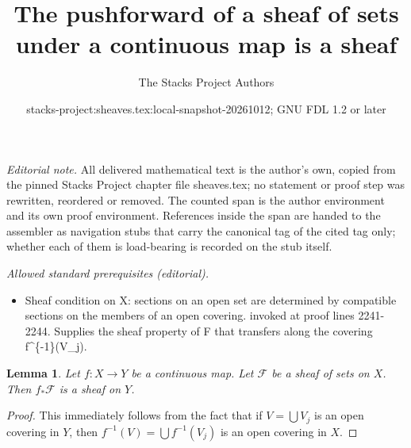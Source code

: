\documentclass{stacks-project}
\title{The pushforward of a sheaf of sets under a continuous map is a sheaf}
\author{The Stacks Project Authors}
\date{stacks-project:sheaves.tex:local-snapshot-20261012; GNU FDL 1.2 or later}
\theoremstyle{plain}
\newtheorem{lemma}[subsection]{Lemma}
\theoremstyle{definition}
\theoremstyle{remark}
\numberwithin{equation}{subsection}
\begin{document}
\maketitle
\setcounter{subsection}{1}
\noindent\textit{Editorial note.} All delivered mathematical text is the author's own, copied from the pinned Stacks Project chapter file sheaves.tex; no statement or proof step was rewritten, reordered or removed. The counted span is the author environment and its own proof environment. References inside the span are handed to the assembler as navigation stubs that carry the canonical tag of the cited tag only; whether each of them is load-bearing is recorded on the stub itself.\par\medskip
\noindent\textit{Allowed standard prerequisites (editorial).}\begin{itemize}
\item Sheaf condition on X: sections on an open set are determined by compatible sections on the members of an open covering. invoked at proof lines 2241-2244. Supplies the sheaf property of F that transfers along the covering f\textasciicircum{}\{-1\}(V\_j).
\end{itemize}\medskip
\begin{lemma}
\label{lemma-pushforward-sheaf}
Let $f : X \to Y$ be a continuous map.
Let $\mathcal{F}$ be a sheaf of sets on $X$.
Then $f_*\mathcal{F}$ is a sheaf on $Y$.
\end{lemma}

\begin{proof}
This immediately follows from the fact that
if $V = \bigcup V_j$ is an open covering in $Y$,
then $f^{-1}(V) = \bigcup f^{-1}(V_j)$ is an open covering in $X$.
\end{proof}
\end{document}
